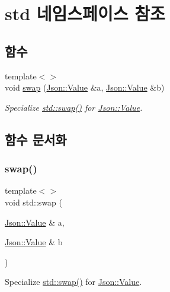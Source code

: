 \hypertarget{namespacestd}{}\section{std 네임스페이스 참조}
\label{namespacestd}
\subsection*{함수}
\begin{DoxyCompactItemize}
\item 
{\footnotesize template$<$$>$ }\\void \hyperlink{namespacestd_a22cc6fcbbb1f2f705c7888b615e43582}{swap} (\hyperlink{class_json_1_1_value}{Json\+::\+Value} \&a, \hyperlink{class_json_1_1_value}{Json\+::\+Value} \&b)
\begin{DoxyCompactList}\small\item\em Specialize \hyperlink{namespacestd_a22cc6fcbbb1f2f705c7888b615e43582}{std\+::swap()} for \hyperlink{class_json_1_1_value}{Json\+::\+Value}. \end{DoxyCompactList}\end{DoxyCompactItemize}


\subsection{함수 문서화}
\mbox{\label{namespacestd_a22cc6fcbbb1f2f705c7888b615e43582}} 
\subsubsection{\texorpdfstring{swap()}{swap()}}
{\footnotesize\ttfamily template$<$$>$ \\
void std\+::swap (\begin{DoxyParamCaption}\item[{\hyperlink{class_json_1_1_value}{Json\+::\+Value} \&}]{a,  }\item[{\hyperlink{class_json_1_1_value}{Json\+::\+Value} \&}]{b }\end{DoxyParamCaption})\hspace{0.3cm}{\ttfamily [inline]}}



Specialize \hyperlink{namespacestd_a22cc6fcbbb1f2f705c7888b615e43582}{std\+::swap()} for \hyperlink{class_json_1_1_value}{Json\+::\+Value}. 



